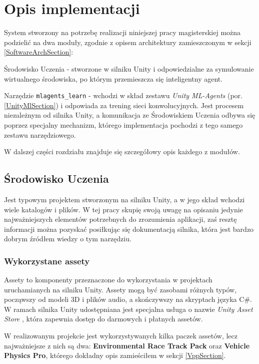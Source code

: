\chapter{Opis implementacji}
\label{ImplementationChapter}
System stworzony na potrzebę realizacji niniejszej pracy magisterskiej można podzielić na dwa moduły, zgodnie z opisem architektury zamieszczonym w sekcji \ref{SoftwareArchSection}:
\begin{enumerate*}
\item Środowisko Uczenia - stworzone w silniku Unity i odpowiedzialne za symulowanie wirtualnego środowiska, po którym przemieszcza się inteligentny agent.
\item Narzędzie \texttt{mlagents\_learn} - wchodzi w skład zestawu \textit{Unity ML-Agents} (por. \ref{UnityMlSection}) i odpowiada za trening sieci konwolucyjnych. Jest procesem niezależnym od silnika Unity, a komunikacja ze Środowiskiem Uczenia odbywa się poprzez specjalny mechanizm, którego implementacja pochodzi z tego samego zestawu narzędziowego.
\end{enumerate*}

W dalszej części rozdziału znajduje się szczegółowy opis każdego z modułów.

\section{Środowisko Uczenia}
Jest typowym projektem stworzonym na silniku Unity, a w jego skład wchodzi wiele katalogów i plików. W tej pracy skupię swoją uwagę na opisaniu jedynie najważniejszych elementów potrzebnych do zrozumienia aplikacji, zaś resztę informacji można pozyskać posiłkując się dokumentacją silnika, która jest bardzo dobrym źródłem wiedzy o tym narzędziu.

\subsection{Wykorzystane assety}
Assety to komponenty przeznaczone do wykorzystania w projektach uruchamianych na silniku Unity. Assety mogą być zasobami różnych typów, począwszy od modeli 3D i plików audio, a skończywszy na skryptach języka C\#. W ramach silnika Unity udostępniana jest specjalna usługa o nazwie \textit{Unity Asset Store} \cite{unity:assetStore}, która zapewnia dostęp do darmowych i płatnych assetów.

W realizowanym projekcie jest wykorzystywanych kilka paczek assetów, lecz najważniejsze z nich są dwa: \textbf{Environmental Race Track Pack} oraz \textbf{Vehicle Physics Pro}, którego dokładny opis zamieściłem w sekcji \ref{VppSection}.

